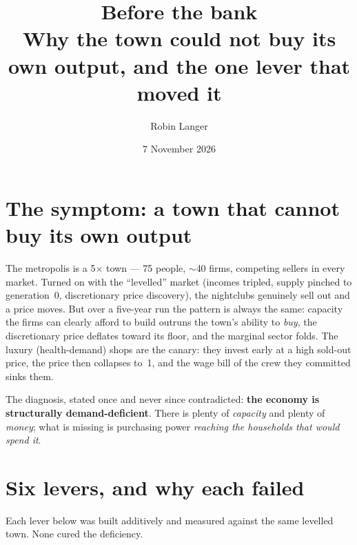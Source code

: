 \documentclass[11pt]{article}
\title{\textbf{Before the bank}\\[2pt]
\large Why the town could not buy its own output, and the one lever that moved it}
\author{Robin Langer}
\date{7 November 2026}
\begin{document}
\maketitle

\section{The symptom: a town that cannot buy its own output}

The metropolis is a 5$\times$ town --- 75 people, $\sim$40 firms, competing
sellers in every market. Turned on with the ``levelled'' market (incomes
tripled, supply pinched to generation~0, discretionary price discovery), the
nightclubs genuinely sell out and a price moves. But over a five-year run the
pattern is always the same: capacity the firms can clearly afford to build
outruns the town's ability to \emph{buy}, the discretionary price deflates toward
its floor, and the marginal sector folds. The luxury (health-demand) shops are
the canary: they invest early at a high sold-out price, the price then collapses
to~1, and the wage bill of the crew they committed sinks them.

The diagnosis, stated once and never since contradicted: \textbf{the economy is
structurally demand-deficient}. There is plenty of \emph{capacity} and plenty of
\emph{money}; what is missing is purchasing power \emph{reaching the households
that would spend it}.

\section{Six levers, and why each failed}

Each lever below was built additively and measured against the same levelled
town. None cured the deficiency.
\end{document}
